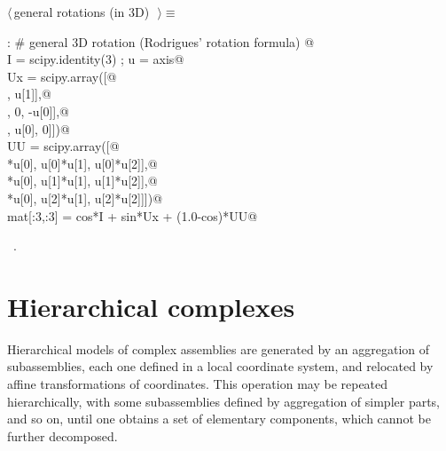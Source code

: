 \documentclass[11pt,oneside]{article}	%
\begin{document}
\begin{flushleft} \small \label{scrap30}
$\langle\,$general rotations (in 3D)\nobreak\ {\footnotesize {}}$\,\rangle\equiv$
\vspace{-1ex}
\begin{list}{}{} \item
\mbox{}\verb@else:    # general 3D rotation (Rodrigues' rotation formula)   @\\
\mbox{}\verb@   I = scipy.identity(3) ; u = axis@\\
\mbox{}\verb@   Ux = scipy.array([@\\
\mbox{}\verb@      [0,      -u[2],    u[1]],@\\
\mbox{}\verb@      [u[2],      0,    -u[0]],@\\
\mbox{}\verb@      [-u[1],   u[0],      0]])@\\
\mbox{}\verb@   UU = scipy.array([@\\
\mbox{}\verb@      [u[0]*u[0], u[0]*u[1],  u[0]*u[2]],@\\
\mbox{}\verb@      [u[1]*u[0], u[1]*u[1],  u[1]*u[2]],@\\
\mbox{}\verb@      [u[2]*u[0], u[2]*u[1],  u[2]*u[2]]])@\\
\mbox{}\verb@   mat[:3,:3] = cos*I + sin*Ux + (1.0-cos)*UU@\\
\mbox{}\verb@@{\NWsep}
\end{list}
\vspace{-1ex}
\footnotesize\addtolength{\baselineskip}{-1ex}
\begin{list}{}{\setlength{\itemsep}{-\parsep}\setlength{\itemindent}{-\leftmargin}}
\item \NWtxtMacroRefIn\ .
\end{list}
\end{flushleft}
\section{Hierarchical complexes}
Hierarchical models of complex assemblies are generated by an aggregation
of subassemblies, each one defined in a local coordinate system, and
relocated by affine transformations of coordinates.  This operation
may be repeated hierarchically, with some subassemblies defined by
aggregation of simpler parts, and so on, until one obtains a set of
elementary components, which cannot be further decomposed.
\end{document}
